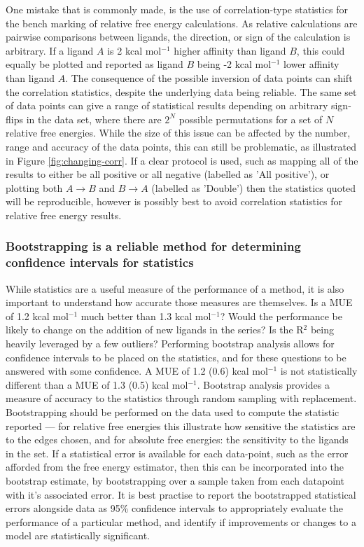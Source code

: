 \documentclass[9pt,bestpractices]{livecoms}
\begin{document}
One mistake that is commonly made, is the use of correlation-type statistics for the bench marking of relative free energy calculations. As relative calculations are pairwise comparisons between ligands, the direction, or sign of the calculation is arbitrary. If a ligand $A$ is 2 kcal mol$^{-1}$ higher affinity than ligand $B$, this could equally be plotted and reported as ligand $B$ being -2 kcal mol$^{-1}$ lower affinity than ligand $A$. The consequence of the possible inversion of data points can shift the correlation statistics, despite the underlying data being reliable. The same set of data points can give a range of statistical results depending on arbitrary sign-flips in the data set, where there are $2^N$ possible permutations for a set of $N$ relative free energies. While the size of this issue can be affected by the number, range and accuracy of the data points, this can still be problematic, as illustrated in Figure \ref{fig:changing-corr}. If a clear protocol is used, such as mapping all of the results to either be all positive or all negative (labelled as 'All positive'), or plotting both $A \rightarrow B$ and $B \rightarrow A$ (labelled as 'Double') then the statistics quoted will be reproducible, however is possibly best to avoid correlation statistics for relative free energy results.

\subsubsection{Bootstrapping is a reliable method for determining confidence intervals for statistics}

While statistics are a useful measure of the performance of a method, it is also important to understand how accurate those measures are themselves. Is a MUE of 1.2 kcal mol$^{-1}$ much better than 1.3 kcal mol$^{-1}$? Would the performance be likely to change on the addition of new ligands in the series? Is the R$^2$ being heavily leveraged by a few outliers? Performing bootstrap analysis allows for confidence intervals to be placed on the statistics, and for these questions to be answered with some confidence. A MUE of 1.2 (0.6) kcal mol$^{-1}$ is not statistically different than a MUE of 1.3 (0.5) kcal mol$^{-1}$. Bootstrap analysis provides a measure of accuracy to the statistics through random sampling with replacement. Bootstrapping should be performed on the data used to compute the statistic reported --- for relative free energies this illustrate how sensitive the statistics are to the edges chosen, and for absolute free energies: the sensitivity to the ligands in the set. If a statistical error is available for each data-point, such as the error afforded from the free energy estimator, then this can be incorporated into the bootstrap estimate, by bootstrapping over a sample taken from each datapoint with it's associated error. It is best practise to report the bootstrapped statistical errors alongside data as 95\% confidence intervals to appropriately evaluate the performance of a particular method, and identify if improvements or changes to a model are statistically significant.
\end{document}
